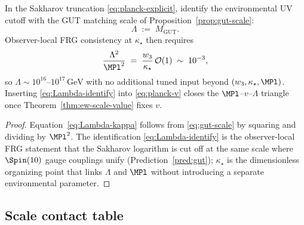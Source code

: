 \begin{proposition}
\label{prop:lambda-gut}
In the Sakharov truncation \eqref{eq:planck-explicit}, identify the
environmental UV cutoff with the GUT matching scale of
Proposition~\ref{prop:gut-scale}:
\begin{equation}\label{eq:Lambda-identify}
  \Lambda \;:=\; M_{\mathrm{GUT}}.
\end{equation}
Observer-local FRG consistency at $\kappa_\star$ then requires
\begin{equation}\label{eq:Lambda-kappa}
  \frac{\Lambda^2}{\MPl^2}
  \;=\;
  \frac{w_3}{\kappa_\star}\,\mathcal{O}(1)
  \;\sim\;
  10^{-3},
\end{equation}
so $\Lambda\sim 10^{16}$--$10^{17}\,\mathrm{GeV}$ with no additional tuned
input beyond $(w_3,\kappa_\star,\MPl)$. Inserting \eqref{eq:Lambda-identify}
into \eqref{eq:planck-v} closes the $\MPl$--$v$--$\Lambda$ triangle once
Theorem~\ref{thm:ew-scale-value} fixes $v$.
\end{proposition}

\begin{proof}
Equation~\eqref{eq:Lambda-kappa} follows from \eqref{eq:gut-scale} by
squaring and dividing by $\MPl^2$. The identification
\eqref{eq:Lambda-identify} is the observer-local FRG statement that the
Sakharov logarithm is cut off at the same scale where $\Spin(10)$ gauge
couplings unify (Prediction~\ref{pred:gut}); $\kappa_\star$ is the
dimensionless organizing point that links $\Lambda$ and $\MPl$ without
introducing a separate environmental parameter.
\end{proof}

\subsection{Scale contact table}
\label{sec:scales:table}

